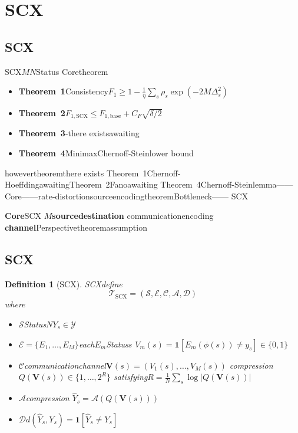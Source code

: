 \documentclass[11pt,a4paper]{article}
\newtheorem{definition}[theorem]{Definition}
\theoremstyle{remark}
\newcommand{\Y}{\mathcal{Y}}
\begin{document}
\section{SCX}

\subsection{SCX}

SCX$M$$N$Status
Coretheorem\cite{scx2026theorems}
\begin{itemize}
    \item \textbf{Theorem~1}Consistency$F_1 \geq 1 - \frac{1}{\eta}\sum_s \rho_s \exp(-2M\Delta_s^2)$
    \item \textbf{Theorem~2}$F_{1,\text{SCX}} \leq F_{1,\text{base}} + C_F\sqrt{\delta/2}$
    \item \textbf{Theorem~3}-there existsawaiting
    \item \textbf{Theorem~4}MinimaxChernoff-Steinlower bound
\end{itemize}

howevertheoremthere exists\textbf{}
Theorem~1Chernoff-HoeffdingawaitingTheorem~2Fanoawaiting
Theorem~4Chernoff-Steinlemma——\emph{}\emph{}
Core——rate-distortionsourceencodingtheoremBottleneck——
SCX

\textbf{Core}SCX
$M$\textbf{source}\textbf{destination}
communicationencoding
\textbf{channel}Perspectivetheoremassumption


\subsection{SCX}

\begin{definition}[SCX]
\label{def:scx_its}
SCXdefine
\begin{equation}
    \boxed{\mathcal{T}_{\text{SCX}} = (\mathcal{S}, \mathcal{E}, \mathcal{C}, \mathcal{A}, \mathcal{D})}
\end{equation}
where
\begin{itemize}
    \item $\mathcal{S}$Status$N$$Y_s \in \Y$
    \item $\mathcal{E} = \{E_1, \ldots, E_M\}$each$E_m$Status$s$
          $V_m(s) = \mathbf{1}[E_m(\phi(s)) \neq y_s] \in \{0,1\}$
    \item $\mathcal{C}$communicationchannel$\mathbf{V}(s) = (V_1(s), \ldots, V_M(s))$
          compression$Q(\mathbf{V}(s)) \in \{1, \ldots, 2^{R}\}$
          satisfying$R = \frac{1}{N}\sum_{s} \log |Q(\mathbf{V}(s))|$
    \item $\mathcal{A}$compression
          $\hat{Y}_s = \mathcal{A}(Q(\mathbf{V}(s)))$
    \item $\mathcal{D}$$d(\hat{Y}_s, Y_s) = \mathbf{1}[\hat{Y}_s \neq Y_s]$
\end{itemize}
\end{definition}
\end{document}
